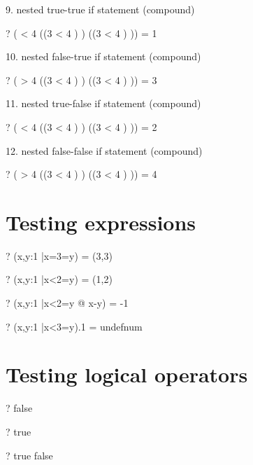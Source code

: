 \documentclass{article}
\newcommand{\negate}{-}
\begin{document}
 9. nested true-true if statement (compound)
\begin{zed} \vdash? ( < 4 \THEN (\IF (3 < 4  \in \nat)  ) \ELSE (\IF (3 < 4  \in \nat) )) = 1 \end{zed}
 10. nested false-true if statement (compound)
\begin{zed} \vdash? ( > 4 \THEN (\IF (3 < 4  \in \nat)  ) \ELSE (\IF (3 < 4  \in \nat) )) = 3 \end{zed}
 11. nested true-false if statement (compound)
\begin{zed} \vdash? ( < 4 \THEN (\IF (3 < 4  \notin \nat)  ) \ELSE (\IF (3 < 4  \in \nat) )) = 2 \end{zed}
 12. nested false-false if statement (compound)
\begin{zed} \vdash? ( > 4 \THEN (\IF (3 < 4  \in \nat)  ) \ELSE (\IF (3 < 4  \notin \nat) )) = 4 \end{zed}


\section{Testing \mu expressions}
\begin{zed} \vdash?  (\mu x,y:1 |x=3=y) = (3,3) \end{zed}
\begin{zed} \vdash?  (\mu x,y:1 |x<2=y) = (1,2) \end{zed}
\begin{zed} \vdash?  (\mu x,y:1 |x<2=y @ x-y) = \negate 1 \end{zed}
\begin{zed} \vdash?  (\mu x,y:1 |x<3=y).1 = undefnum \end{zed}


\section{Testing logical operators}
\begin{zed} \vdash?  \lnot false \end{zed}
\begin{zed} \vdash?  \lnot \lnot true \end{zed}
\begin{zed} \vdash?  \lnot true \iff false \end{zed}
\end{document}
